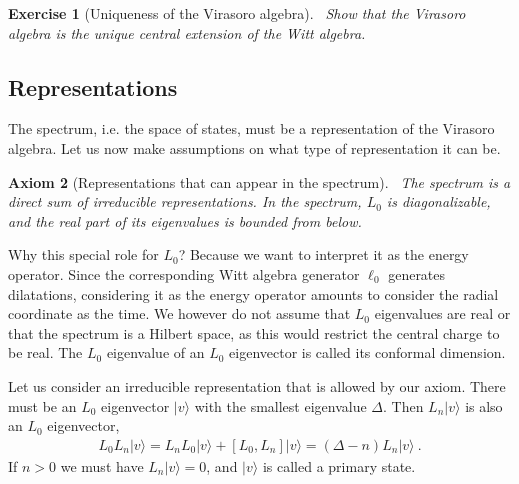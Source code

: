 \documentclass[12pt, a4paper]{article}
\theoremstyle{break}
\newtheorem{exo}{Exercise}[section]
\newtheorem{hyp}[exo]{Axiom}
\begin{document}
\begin{exo}[Uniqueness of the Virasoro algebra]
 ~\label{exo:vir}
 Show that the Virasoro algebra is the unique central extension of the Witt algebra.
\end{exo}


\subsection{Representations}

The spectrum, i.e. the space of states, must be a representation of the Virasoro algebra. Let us now make assumptions on what type of representation it can be.

\begin{hyp}[Representations that can appear in the spectrum]
 ~\label{hyp:rep}
 The spectrum is a direct sum of irreducible representations. In the spectrum, $L_0$ is diagonalizable, and the real part of its eigenvalues is bounded from below.
\end{hyp}
Why this special role for $L_0$? Because we want to interpret it as the energy operator. Since the corresponding Witt algebra generator $\ell_0$ generates dilatations, considering it as the energy operator amounts to consider the radial coordinate as the time. We however do not assume that $L_0$ eigenvalues are real or that the spectrum is a Hilbert space, as this would restrict the central charge to be real. The $L_0$ eigenvalue of an $L_0$ eigenvector is called its conformal dimension.

Let us consider an irreducible representation that is allowed by our axiom. There must be an $L_0$ eigenvector $|v\rangle$ with the smallest eigenvalue $\Delta$. Then $L_n|v\rangle$ is also an $L_0$ eigenvector,
\begin{align}
 L_0 L_n|v\rangle = L_nL_0|v\rangle + [L_0, L_n] |v\rangle  = (\Delta-n)L_n|v\rangle \ .
\end{align}
If $n>0$ we must have $L_n|v\rangle =0$, and $|v\rangle $ is called a primary state.
\end{document}
